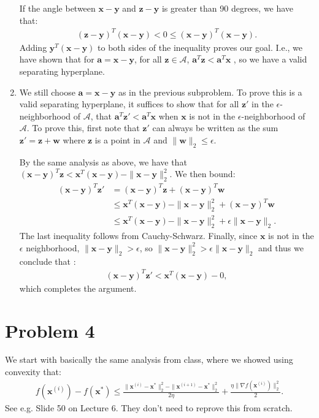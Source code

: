 \documentclass[11pt]{article}
\newcommand{\bv}[1]{\mathbf{#1}}
\begin{document}
\begin{enumerate}[label=(\alph*)]
		If the angle between $\bv{x} - \bv{y}$ and $\bv{z} - \bv{y}$  is greater than 90 degrees, we have that:
		\begin{align*}
			(\bv{z}-\bv{y})^T(\bv{x}-\bv{y}) < 0 \leq (\bv{x}-\bv{y})^T(\bv{x}-\bv{y}).
		\end{align*}
		Adding $\bv{y}^T(\bv{x}-\bv{y})$ to both sides of the inequality proves our goal. I.e., we have
	shown that for $\bv{a} = \bv{x} - \bv{y}$, for all $\bv{z}\in \mathcal{A}$, $\bv{a}^T \bv{z}  < \bv{a}^T\bv{x}$ , so we have a valid separating hyperplane.
		
		\item
		We still choose $\bv{a} = \bv{x} - \bv{y}$ as in the previous subproblem. To prove this is a valid separating hyperplane, it suffices to show that for all $\bv{z}'$ in the $\epsilon$-neighborhood of $\mathcal{A}$, that $\bv{a}^T\bv{z}' < \bv{a}^T \bv{x}$ when $\bv{x}$ is not in the $\epsilon$-neighborhood of $\mathcal{A}$. To prove this, first note that $\bv{z}'$ can always be written as the sum $\bv{z}' = \bv{z} + \bv{w}$ where $\bv{z}$ is a point in $\mathcal{A}$ and $\|\bv{w}\|_2 \leq \epsilon$.  
		
By the same analysis as above, we have that $(\bv{x}-\bv{y})^T \bv{z} < \bv{x}^T (\bv{x}-\bv{y}) -\|\bv{x}-\bv{y}\|_2^2$. We then bound:
\begin{align}
	(\bv{x}-\bv{y})^T \bv{z}' &= (\bv{x}-\bv{y})^T \bv{z} + (\bv{x}-\bv{y})^T \bv{w}\\
	&\leq  \bv{x}^T (\bv{x}-\bv{y}) - \|\bv{x} - \bv{y}\|_2^2 + (\bv{x}-\bv{y})^T \bv{w}\\
		&\leq  \bv{x}^T (\bv{x}-\bv{y}) - \|\bv{x} - \bv{y}\|_2^2 + \epsilon \|\bv{x}-\bv{y}\|_2.
\end{align}
The last inequality follows from Cauchy-Schwarz. Finally, since $\bv{x}$ is not in the $\epsilon$ neighborhood, $\|\bv{x}-\bv{y}\|_2 > \epsilon$, so  $\|\bv{x} - \bv{y}\|_2^2 > \epsilon \|\bv{x}-\bv{y}\|_2$ and thus we conclude that :
\begin{align*}
	(\bv{x}-\bv{y})^T \bv{z}'  <  \bv{x}^T (\bv{x}-\bv{y})  - 0,
\end{align*}
which completes the argument.
	\end{enumerate}
	
\section*{Problem 4}
We start with basically the same analysis from class, where we showed using convexity that:
\begin{align*}
	f(\bv{x}^{(i)}) - f(\bv{x}^*) \leq \frac{\|\bv{x}^{(i)} - \bv{x}^*\|_2^2 - \|\bv{x}^{(i+1)} - \bv{x}^*\|_2^2}{2\eta} + \frac{\eta \|\nabla f(\bv{x}^{(i)})\|_2^2}{2}. 
\end{align*}
See e.g. Slide 50 on Lecture 6. They don't need to reprove this from scratch.
\end{document}
